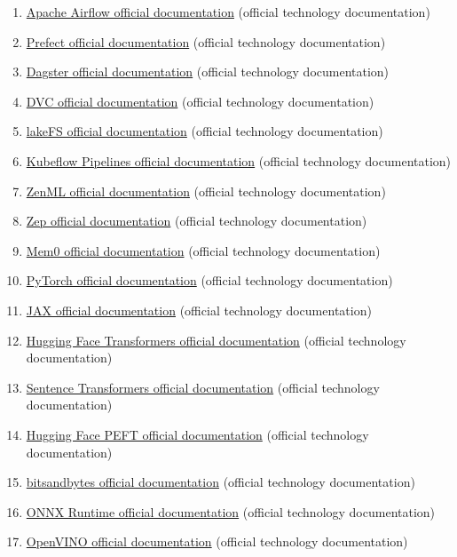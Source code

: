 \begin{enumerate}
\item \href{https://airflow.apache.org/docs/}{Apache Airflow official documentation} (official technology documentation)
\item \href{https://docs.prefect.io/}{Prefect official documentation} (official technology documentation)
\item \href{https://docs.dagster.io/}{Dagster official documentation} (official technology documentation)
\item \href{https://dvc.org/doc}{DVC official documentation} (official technology documentation)
\item \href{https://docs.lakefs.io/}{lakeFS official documentation} (official technology documentation)
\item \href{https://www.kubeflow.org/docs/components/pipelines/}{Kubeflow Pipelines official documentation} (official technology documentation)
\item \href{https://docs.zenml.io/}{ZenML official documentation} (official technology documentation)
\item \href{https://help.getzep.com/}{Zep official documentation} (official technology documentation)
\item \href{https://docs.mem0.ai/}{Mem0 official documentation} (official technology documentation)
\item \href{https://docs.pytorch.org/docs/stable/index.html}{PyTorch official documentation} (official technology documentation)
\item \href{https://docs.jax.dev/en/latest/}{JAX official documentation} (official technology documentation)
\item \href{https://huggingface.co/docs/transformers/index}{Hugging Face Transformers official documentation} (official technology documentation)
\item \href{https://sbert.net/}{Sentence Transformers official documentation} (official technology documentation)
\item \href{https://huggingface.co/docs/peft/index}{Hugging Face PEFT official documentation} (official technology documentation)
\item \href{https://huggingface.co/docs/bitsandbytes/main/en/index}{bitsandbytes official documentation} (official technology documentation)
\item \href{https://onnxruntime.ai/docs/}{ONNX Runtime official documentation} (official technology documentation)
\item \href{https://docs.openvino.ai/}{OpenVINO official documentation} (official technology documentation)

\end{enumerate}
